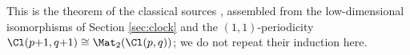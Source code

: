 This is the theorem of the classical sources \cite{ABS1964, Porteous1995, Lounesto2001}, assembled from the low-dimensional isomorphisms of Section \ref{sec:clock} and the $(1,1)$-periodicity $\Cl(p{+}1,q{+}1) \cong \Mat_2(\Cl(p,q))$; we do not repeat their induction here.
